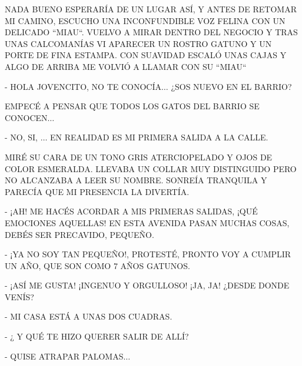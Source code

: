 \newpage
{}
NADA BUENO ESPERARÍA DE UN LUGAR ASÍ, Y ANTES DE RETOMAR MI CAMINO, ESCUCHO UNA INCONFUNDIBLE VOZ FELINA CON UN DELICADO ``MIAU``. VUELVO A MIRAR DENTRO DEL NEGOCIO Y TRAS UNAS CALCOMANÍAS VI APARECER UN ROSTRO GATUNO Y UN PORTE DE FINA ESTAMPA. CON SUAVIDAD ESCALÓ UNAS CAJAS Y ALGO DE ARRIBA ME VOLVIÓ A LLAMAR CON SU ``MIAU``

- HOLA JOVENCITO, NO TE CONOCÍA$\ldots$ ¿SOS NUEVO EN EL BARRIO?

EMPECÉ A PENSAR QUE TODOS LOS GATOS DEL BARRIO SE CONOCEN$\ldots$

- NO, SI, $\ldots$ EN REALIDAD ES MI PRIMERA SALIDA A LA CALLE.




\newpage
{}
MIRÉ SU CARA DE UN TONO GRIS ATERCIOPELADO Y OJOS DE COLOR  ESMERALDA. LLEVABA UN COLLAR MUY DISTINGUIDO PERO NO ALCANZABA A LEER SU NOMBRE. SONREÍA TRANQUILA Y PARECÍA QUE MI PRESENCIA LA DIVERTÍA.

- ¡AH! ME HACÉS ACORDAR A MIS PRIMERAS SALIDAS, ¡QUÉ EMOCIONES AQUELLAS! EN ESTA AVENIDA PASAN MUCHAS COSAS, DEBÉS SER PRECAVIDO, PEQUEÑO.

- ¡YA NO SOY TAN PEQUEÑO!, PROTESTÉ, PRONTO VOY A CUMPLIR UN AÑO, QUE SON COMO 7 AÑOS GATUNOS. 

- ¡ASÍ ME GUSTA! ¡INGENUO Y ORGULLOSO! ¡JA, JA! ¿DESDE DONDE VENÍS?

- MI CASA ESTÁ A UNAS DOS CUADRAS.

- ¿ Y QUÉ TE HIZO QUERER SALIR DE ALLÍ?



\newpage
{}
- QUISE ATRAPAR PALOMAS$\ldots$

